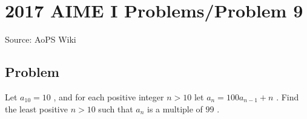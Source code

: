 \documentclass[12pt]{article}
\begin{document}
\section*{{2017 AIME I Problems/Problem 9}}
Source: AoPS Wiki

\subsection*{Problem}
Let $a_{10} = 10$ , and for each positive integer $n >10$ let $a_n = 100a_{n - 1} + n$ . Find the least positive $n > 10$ such that $a_n$ is a multiple of $99$ .
\end{document}
